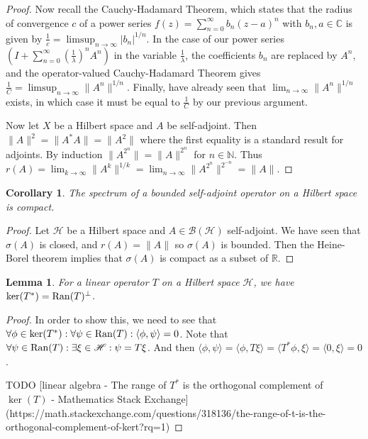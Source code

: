 \documentclass[12pt,oneside]{report}
\newtheorem{cor}[thm]{Corollary}
\newtheorem{lem}[thm]{Lemma}
\begin{document}
\begin{proof}
    Now recall the Cauchy-Hadamard Theorem, which states that the radius of convergence $c$ of a power series $f(z)= \sum_{n=0}^{\infty} b_{n}(z-a)^{n}$ with $b_{n}, a \in \mathbb{C}$ is given by $\frac{1}{c} = \limsup_{n \to \infty} |b_{n}|^{1/n}$. In the case of our power series $\left( I + \sum_{n=0}^{\infty} \left( \frac{1}{\lambda} \right)^{n}A^{n} \right)$ in the variable $\frac{1}{\lambda}$, the coefficients $b_{n}$ are replaced by $A^{n}$, and the operator-valued Cauchy-Hadamard Theorem gives $\frac{1}{C} = \limsup_{n \to \infty} \|A^{n}\|^{1/n}$. Finally, have already seen that $\lim_{ n \to \infty }\|A^{n}\|^{1/n}$ exists, in which case it must be equal to $\frac{1}{C}$ by our previous argument.

    Now let $X$ be a Hilbert space and $A$ be self-adjoint. Then $\|A\|^{2} = \|A^{*}A\| = \|A^{2}\|$ where the first equality is a standard result for adjoints. By induction $\|A^{2^{n}}\| = \|A\|^{2^{n}}$ for $n \in \mathbb{N}$. Thus $r(A) = \lim_{ k \to \infty } \|A^{k}\|^{1/k} = \lim_{ n \to \infty } \|A^{2^{n}}\|^{2^{-n}} = \|A\|$.
\end{proof}

\begin{cor}
    The spectrum of a bounded self-adjoint operator on a Hilbert space is compact.
\end{cor}
\begin{proof}
    Let $\mathscr{H}$ be a Hilbert space and $A \in \mathscr{B}(\mathscr{H})$ self-adjoint. We have seen that $\sigma(A)$ is closed, and $r(A) = \|A\|$ so $\sigma(A)$ is bounded. Then the Heine-Borel theorem implies that $\sigma(A)$ is compact as a subset of $\mathbb{R}$.
\end{proof}

\begin{lem}\label{adjoint-ker-orth-to-operator-range}
    For a linear operator $T$ on a Hilbert space $\mathscr{H}$, we have $\ker(T^{*}) = \mathrm{Ran}(T)^{\perp}$.
\end{lem}
\begin{proof}
    In order to show this, we need to see that $\forall \phi \in \ker(T^{*}): \forall \psi \in \mathrm{Ran}(T): \langle \phi, \psi \rangle = 0$. Note that $\forall \psi \in \mathrm{Ran}(T): \exists \xi \in \mathscr{H}: \psi = T\xi$. And then $\langle \phi, \psi \rangle = \langle \phi, T\xi \rangle = \langle T^{*}\phi, \xi \rangle = \langle 0, \xi \rangle = 0$.
    
    TODO [linear algebra - The range of $T^*$ is the orthogonal complement of $\ker(T)$ - Mathematics Stack Exchange](https://math.stackexchange.com/questions/318136/the-range-of-t-is-the-orthogonal-complement-of-kert?rq=1)
\end{proof}
\end{document}

